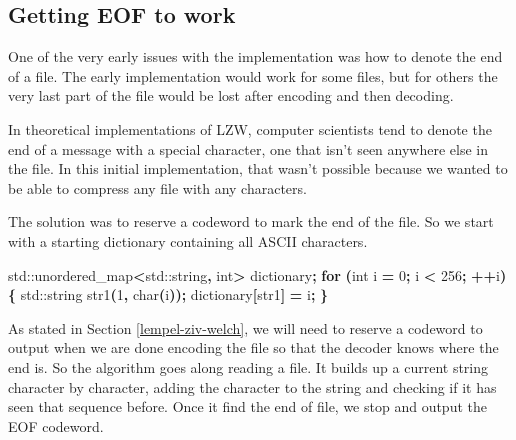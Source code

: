 \documentclass[12pt,twoside]{reedthesis}
\newenvironment{Shaded}{\begin{snugshade}}{\end{snugshade}}
\newcommand{\BuiltInTok}[1]{#1}
\newcommand{\ControlFlowTok}[1]{\textcolor[rgb]{0.13,0.29,0.53}{\textbf{#1}}}
\newcommand{\DataTypeTok}[1]{\textcolor[rgb]{0.13,0.29,0.53}{#1}}
\newcommand{\DecValTok}[1]{\textcolor[rgb]{0.00,0.00,0.81}{#1}}
\newcommand{\NormalTok}[1]{#1}
\newcommand{\OperatorTok}[1]{\textcolor[rgb]{0.81,0.36,0.00}{\textbf{#1}}}
\begin{document}
\hypertarget{getting-eof-to-work}{%
\subsection{Getting EOF to work}\label{getting-eof-to-work}}

One of the very early issues with the implementation was how to denote the end of a file. The early implementation would work for some files, but for others the very last part of the file would be lost after encoding and then decoding.

In theoretical implementations of LZW, computer scientists tend to denote the end of a message with a special character, one that isn't seen anywhere else in the file. In this initial implementation, that wasn't possible because we wanted to be able to compress any file with any characters.

The solution was to reserve a codeword to mark the end of the file. So we start with a starting dictionary containing all ASCII characters.
\begin{Shaded}
\begin{Highlighting}[]
    \BuiltInTok{std::}\NormalTok{unordered\_map}\OperatorTok{\textless{}}\BuiltInTok{std::}\NormalTok{string}\OperatorTok{,} \DataTypeTok{int}\OperatorTok{\textgreater{}}\NormalTok{ dictionary}\OperatorTok{;}
    \ControlFlowTok{for} \OperatorTok{(}\DataTypeTok{int}\NormalTok{ i }\OperatorTok{=} \DecValTok{0}\OperatorTok{;}\NormalTok{ i }\OperatorTok{\textless{}} \DecValTok{256}\OperatorTok{;} \OperatorTok{++}\NormalTok{i}\OperatorTok{)\{}
        \BuiltInTok{std::}\NormalTok{string}\OperatorTok{ }\NormalTok{str1}\OperatorTok{(}\DecValTok{1}\OperatorTok{,} \DataTypeTok{char}\OperatorTok{(}\NormalTok{i}\OperatorTok{));}
\NormalTok{        dictionary}\OperatorTok{[}\NormalTok{str1}\OperatorTok{]} \OperatorTok{=}\NormalTok{ i}\OperatorTok{;}
    \OperatorTok{\}}
\end{Highlighting}
\end{Shaded}
As stated in Section \ref{lempel-ziv-welch}, we will need to reserve a codeword to output when we are done encoding the file so that the decoder knows where the end is. So the algorithm goes along reading a file. It builds up a current string character by character, adding the character to the string and checking if it has seen that sequence before. Once it find the end of file, we stop and output the EOF codeword.
\end{document}
